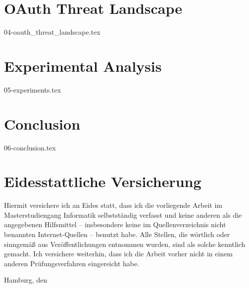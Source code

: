 \documentclass[
    fontsize=12pt,
    headings=small,
    parskip=half,           %
    bibliography=totoc,
    numbers=noenddot,       %
    open=any,               %
	final                   %
    ]{scrreprt}
\begin{document}
\chapter{OAuth Threat Landscape}
\label{chap:oauth_security}
{04-oauth_threat_landscape.tex}

\chapter{Experimental Analysis}
\label{chap:experimental_analysis}
{05-experiments.tex}

\chapter{Conclusion}
\label{chap:conclusion}
{06-conclusion.tex}


\begin{raggedright}         %
  \printbibliography        %
  \label{sec:literaturverzeichnis}
\end{raggedright}


\appendix
\setcounter{figure}{0}
\renewcommand\thetable{A.\arabic{figure}}
\setcounter{table}{0}
\renewcommand\thetable{A.\arabic{table}}
\newpage
		
\chapter*{Eidesstattliche Versicherung} %
\vspace{1cm}
%
Hiermit versichere ich an Eides statt, dass ich die vorliegende Arbeit im
Masterstudiengang Informatik selbstständig verfasst
und keine anderen als die angegebenen Hilfsmittel – insbesondere keine
im Quellenverzeichnis nicht benannten Internet-Quellen – benutzt
habe. Alle Stellen, die wörtlich oder sinngemäß aus Veröffentlichungen
entnommen wurden, sind als solche kenntlich gemacht. Ich versichere
weiterhin, dass ich die Arbeit vorher nicht in einem anderen
Prüfungsverfahren eingereicht habe.

\makeatletter
Hamburg, den {\@date}
\makeatother
\end{document}
